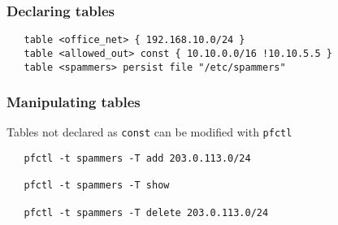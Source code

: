 \documentclass[10pt]{beamer}
\begin{document}
\begin{frame}[fragile]
  \frametitle{Declaring tables}

 \begin{verbatim}
   table <office_net> { 192.168.10.0/24 }
   table <allowed_out> const { 10.10.0.0/16 !10.10.5.5 }
   table <spammers> persist file "/etc/spammers"
 \end{verbatim}

\end{frame}


\begin{frame}[fragile]
  \frametitle{Manipulating tables}

 Tables not declared as \texttt{const} can be modified with \texttt{pfctl}
 \begin{verbatim}
   pfctl -t spammers -T add 203.0.113.0/24

   pfctl -t spammers -T show

   pfctl -t spammers -T delete 203.0.113.0/24
 \end{verbatim}

\end{frame}
\end{document}

